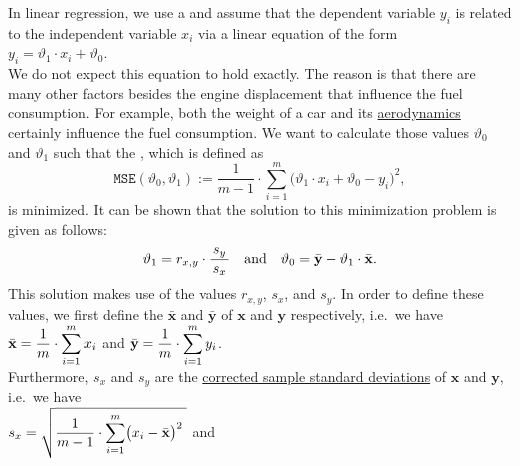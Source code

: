 In linear regression, we use a  
and assume that the dependent variable $y_i$ is related to the independent variable $x_i$ via a linear
equation of the form
\\[0.2cm]
\hspace*{1.3cm}
$y_i = \vartheta_1 \cdot x_i + \vartheta_0$.
\\[0.2cm]
We do not expect this equation to hold exactly.  The reason is that there are many other factors besides the
engine displacement that influence the fuel consumption.  For example, both the weight of a car and its 
\href{https://en.wikipedia.org/wiki/Automotive_aerodynamics}{aerodynamics} certainly influence the fuel consumption.  
We want to calculate those values $\vartheta_0$ and $\vartheta_1$ such that the 
,  which is defined as 
\begin{equation}
  \label{eq:mse}
 \mathtt{MSE}(\vartheta_0, \vartheta_1) := \frac{1}{m-1} \cdot \sum\limits_{i=1}^m \bigl(\vartheta_1 \cdot x_i + \vartheta_0 - y_i\bigr)^2,
\end{equation}
is minimized.  It can be shown that the solution to this minimization problem is given as follows:
\begin{equation}
  \label{eq:theta0}
  \displaystyle \vartheta_1 = r_{x,y} \cdot \frac{\,s_y\,}{s_x} \quad \mbox{and} \quad
      \vartheta_0 = \bar{\mathbf{y}} - \vartheta_1 \cdot \bar{\mathbf{x}}.
\end{equation}
This solution makes use of the values $r_{x,y}$, $s_x$, and $s_y$.  In order to define these values, we first
define the  
$\bar{\mathbf{x}}$ and $\bar{\mathbf{y}}$ of $\mathbf{x}$ and $\mathbf{y}$ respectively, i.e.~we have 
\\[0.2cm]
\hspace*{1.3cm}
$\displaystyle \bar{\mathbf{x}} = \frac{1}{m} \cdot \sum\limits_{i=1}^m x_i$ \quad and \quad
$\displaystyle \bar{\mathbf{y}} = \frac{1}{m} \cdot \sum\limits_{i=1}^m y_i$.
\\[0.2cm]
Furthermore, $s_x$ and $s_y$ are the \href{https://en.wikipedia.org/wiki/Standard_deviation#Sample_standard_deviation}{corrected sample standard deviations} 
of $\mathbf{x}$ and $\mathbf{y}$, i.e.~we have
\\[0.2cm]
\hspace*{1.3cm}
$\displaystyle s_x = \sqrt{\frac{1}{m-1} \cdot \sum\limits_{i=1}^m \bigl(x_i - \bar{\mathbf{x}}\bigr)^2\;}$ \quad and \quad
